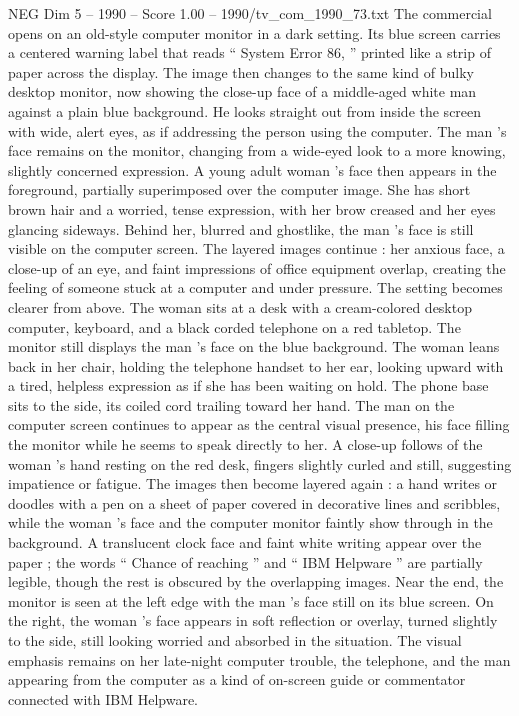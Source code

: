 \begin{textsample}{NEG Dim 5 – 1990 – Score 1.00 – 1990/tv\_com\_1990\_73.txt}  \label{ex:f5_neg_090}
The commercial opens on an old-style computer monitor in a dark setting.
Its blue screen carries a centered warning label that reads “ System Error 86, ” printed like a strip of paper across the display.
The image then changes to the same kind of bulky desktop monitor, now showing the close-up face of a middle-aged white man against a plain blue background.
He looks straight out from inside the screen with wide, alert eyes, as if addressing the person using the computer.
The man ’s face remains on the monitor, changing from a wide-eyed look to a more knowing, slightly concerned expression.
A young adult woman ’s face then appears in the foreground, partially superimposed over the computer image.
She has short brown hair and a worried, tense expression, with her brow creased and her eyes glancing sideways.
Behind her, blurred and ghostlike, the man ’s face is still visible on the computer screen.
The layered images continue : her anxious face, a close-up of an eye, and faint impressions of office equipment overlap, creating the feeling of someone stuck at a computer and under pressure.
The setting becomes clearer from above.
The woman sits at a desk with a cream-colored desktop computer, keyboard, and a black corded telephone on a red tabletop.
The monitor still displays the man ’s face on the blue background.
The woman leans back in her chair, holding the telephone handset to her ear, looking upward with a tired, helpless expression as if she has been waiting on hold.
The phone base sits to the side, its coiled cord trailing toward her hand.
The man on the computer screen continues to appear as the central visual presence, his face filling the monitor while he seems to speak directly to her.
A close-up follows of the woman ’s hand resting on the red desk, fingers slightly curled and still, suggesting impatience or fatigue.
The images then become layered again : a hand writes or doodles with a pen on a sheet of paper covered in decorative lines and scribbles, while the woman ’s face and the computer monitor faintly show through in the background.
A translucent clock face and faint white writing appear over the paper ; the words “ Chance of reaching ” and “ IBM Helpware ” are partially legible, though the rest is obscured by the overlapping images.
Near the end, the monitor is seen at the left edge with the man ’s face still on its blue screen.
On the right, the woman ’s face appears in soft reflection or overlay, turned slightly to the side, still looking worried and absorbed in the situation.
The visual emphasis remains on her late-night computer trouble, the telephone, and the man appearing from the computer as a kind of on-screen guide or commentator connected with IBM Helpware.

\end{textsample}
